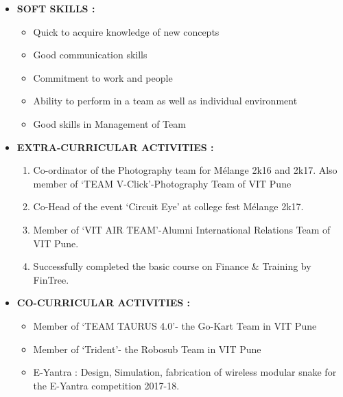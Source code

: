 \documentclass[11pt]{article}
\begin{document}
\begin{itemize}[label=$\star$]
\bigskip
\item	\begin{large} \textbf{SOFT SKILLS :} \end{large}
\begin{itemize}[label=$\bullet$]
	\item Quick to acquire knowledge of new concepts
	\item Good communication skills
	\item Commitment to work and people
	\item Ability to perform in a team as well as individual environment
	\item Good skills in Management of Team
\end{itemize}
	
\bigskip
\item	\begin{large} \textbf{EXTRA-CURRICULAR ACTIVITIES :} \end{large}
\begin{enumerate}
	\item Co-ordinator of the Photography team for Mélange 2k16 and 2k17. Also member of ‘TEAM V-Click’-Photography Team of VIT Pune
	\item Co-Head of the event ‘Circuit Eye’ at college fest Mélange 2k17. 
	\item Member of ‘VIT AIR TEAM’-Alumni International Relations Team of VIT Pune.
	\item Successfully completed the basic course on Finance \& Training by FinTree.
\end{enumerate}

\bigskip
\item	\begin{large} \textbf{CO-CURRICULAR ACTIVITIES :} \end{large}
\begin{itemize}[label=$\bullet$]
	\item Member of ‘TEAM TAURUS 4.0’- the Go-Kart Team in VIT Pune
	\item Member of ‘Trident’- the Robosub Team in VIT Pune
	\item E-Yantra : Design, Simulation, fabrication of wireless modular snake for the E-Yantra competition 2017-18.
\end{itemize}


\end{itemize}
\end{document}
